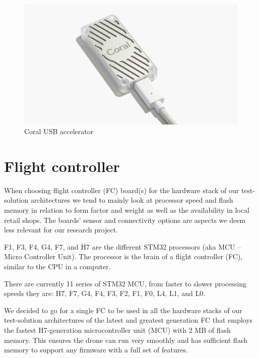 \begin{figure}[h]
    \centering
    \includegraphics[scale=0.15]{fig/Coral TPU.jpg}
    \caption{Coral USB accelerator \cite{CoralTPU_bilde}}
\end{figure}

\section{Flight controller}
\label{fc}

When choosing flight controller (FC) board(s) for the hardware stack of our test-solution architectures we tend to mainly look at processor speed and flash memory in relation to form factor and weight as well as the availability in local retail shops. The boards' sensor and connectivity options are aspects we deem less relevant for our research project.

F1, F3, F4, G4, F7, and H7 are the different STM32 processors (aka MCU – Micro Controller Unit). The processor is the brain of a flight controller (FC), similar to the CPU in a computer.

There are currently 11 series of STM32 MCU, from faster to slower processing speeds they are: H7, F7, G4, F4, F3, F2, F1, F0, L4, L1, and L0. \cite{comparison-FC}

We decided to go for a single FC to be used in all the hardware stacks of our test-solution architectures of the latest and greatest generation FC that employs the fastest H7-generation microcontroller unit (MCU) with 2 MB of flash memory. This ensures the drone can run very smoothly and has sufficient flash memory to support any firmware with a full set of features.

